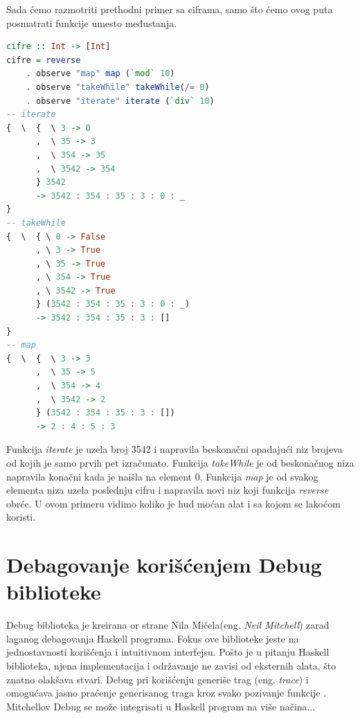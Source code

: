 \documentclass[a4paper]{article}
\begin{document}
Sada ćemo razmotriti prethodni primer sa ciframa, samo što ćemo ovog puta posmatrati funkcije umesto međustanja.
\begin{lstlisting}[language=Haskell]
cifre :: Int -> [Int]
cifre = reverse 
	. observe "map" map (`mod` 10)
	. observe "takeWhile" takeWhile(/= 0)
	. observe "iterate" iterate (`div` 10)
-- iterate 
{  \  {  \ 3 -> 0
      ,  \ 35 -> 3
      ,  \ 354 -> 35
      ,  \ 3542 -> 354
      } 3542
      -> 3542 : 354 : 35 : 3 : 0 : _
}
-- takeWhile
{  \  { \ 0 -> False
      , \ 3 -> True
      , \ 35 -> True
      , \ 354 -> True
      , \ 3542 -> True
      } (3542 : 354 : 35 : 3 : 0 : _)
      -> 3542 : 354 : 35 : 3 : []
}
-- map
{  \  {  \ 3 -> 3
      ,  \ 35 -> 5
      ,  \ 354 -> 4
      ,  \ 3542 -> 2  
      } (3542 : 354 : 35 : 3 : [])
      -> 2 : 4 : 5 : 3
\end{lstlisting}
Funkcija {\em iterate} je uzela broj 3542 i napravila beskonačni opadajući niz brojeva od kojih je samo prvih pet izračunato.
Funkcija {\em takeWhile} je od beskonačnog niza napravila konačni kada je naišla na element 0.
Funkcija {\em map} je od svakog elementa niza uzela poslednju cifru i napravila novi niz koji funkcija {\em reverse} obrće.
U ovom primeru vidimo koliko je hud moćan alat i sa kojom se lakoćom koristi.

\section{Debagovanje korišćenjem Debug biblioteke}
Debug biblioteka je kreirana or strane Nila Mičela(eng. {\em Neil Mitchell}) zarad laganog debagovanja Haskell programa. Fokus ove biblioteke jeste na jednostavnosti korišćenja i intuitivnom interfejsu. Pošto je u pitanju Haskell biblioteka, njena implementacija i održavanje ne zavisi od eksternih alata, što znatno olakšava stvari. Debug pri korišćenju generiše trag (eng. {\em trace}) i omogućava jasno praćenje generisanog traga kroz svako pozivanje funkcije \cite{chitil2002transforming}.
Mitchellov Debug se može integrisati u Haskell program na više načina...
\end{document}
